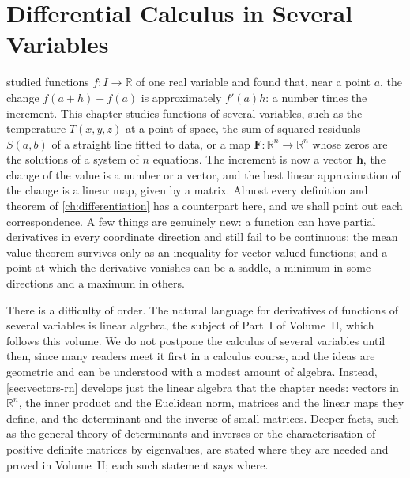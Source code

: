 \chapter{Differential Calculus in Several Variables}
\label{ch:several-variables}


 studied functions $f\colon I\to\mathbb R$ of one real variable and found that, near a point $a$, the change $f(a+h)-f(a)$ is approximately $f'(a)h$: a number times the increment. This chapter studies functions of several variables, such as the temperature $T(x,y,z)$ at a point of space, the sum of squared residuals $S(a,b)$ of a straight line fitted to data, or a map $\mathbf F\colon\mathbb R^n\to\mathbb R^n$ whose zeros are the solutions of a system of $n$ equations. The increment is now a vector $\mathbf h$, the change of the value is a number or a vector, and the best linear approximation of the change is a linear map, given by a matrix. Almost every definition and theorem of \cref{ch:differentiation} has a counterpart here, and we shall point out each correspondence. A few things are genuinely new: a function can have partial derivatives in every coordinate direction and still fail to be continuous; the mean value theorem survives only as an inequality for vector-valued functions; and a point at which the derivative vanishes can be a saddle, a minimum in some directions and a maximum in others.

There is a difficulty of order. The natural language for derivatives of functions of several variables is linear algebra, the subject of Part~I of Volume~II, which follows this volume. We do not postpone the calculus of several variables until then, since many readers meet it first in a calculus course, and the ideas are geometric and can be understood with a modest amount of algebra. Instead, \cref{sec:vectors-rn} develops just the linear algebra that the chapter needs: vectors in $\mathbb R^n$, the inner product and the Euclidean norm, matrices and the linear maps they define, and the determinant and the inverse of small matrices. Deeper facts, such as the general theory of determinants and inverses or the characterisation of positive definite matrices by eigenvalues, are stated where they are needed and proved in Volume~II; each such statement says where.

